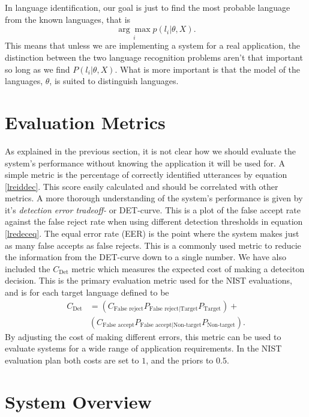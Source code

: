  In language identification, our goal is just to find the most probable language from the known languages, that is
\begin{equation}
\label{lreiddec}
\underset{i}{\arg \max} p(l_i | \theta, X).
\end{equation}
This means that unless we are implementing a system for a real application, the distinction between the two language recognition problems aren't that important so long as we find $P(l_i | \theta, X)$. What is more important is that the model of the languages, $\theta$, is suited to distinguish languages.

\section{Evaluation Metrics}

As explained in the previous section, it is not clear how we should evaluate the system's performance without knowing the application it will be used for. A simple metric is the percentage of correctly identified utterances by equation \ref{lreiddec}. This score easily calculated and should be correlated with other metrics. A more thorough understanding of the system's performance is given by it's \emph{detection error tradeoff-} or DET-curve. This is a plot of the false accept rate against the false reject rate when using different detection thresholds in equation \ref{lredeceq}. The equal error rate (EER) is the point where the system makes just as many false accepts as false rejects. This is a commonly used metric to reducie the information from the DET-curve down to a single number. We have also included the $C_{\text{Det}}$ metric which measures the expected cost of making a deteciton decision. This is the primary evaluation metric used for the NIST evaluations, and is for each target language defined to be \cite{martin2003nist}
\begin{align*}
C_{\text{Det}} &=(C_{\text{False reject}}P_{\text{False reject} | \text{Target}}P_{\text{Target}})+\\
&(C_{\text{False accept}}P_{\text{False accept} | \text{Non-target}}P_{\text{Non-target}}).
\end{align*}
By adjusting the cost of making different errors, this metric can be used to evaluate systems for a wide range of application requirements. In the NIST evaluation plan both costs are set to $1$, and the priors to $0.5$. 

\section{System Overview}
\label{sect:sysoverview}

